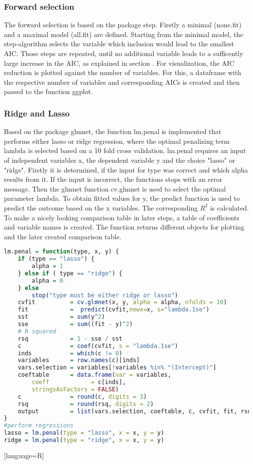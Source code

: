 \subsubsection{Forward selection}
The forward selection is based on the package step. Firstly a minimal (none.fit) and a maximal model (all.fit) are defined. Starting from the minimal model, the step-algorithm selects the variable which inclusion would lead to the smallest AIC. Those steps are repeated, until no additional variable leads to a sufficently large increase in the AIC, as explained in section . 
For visualization, the AIC reduction is plotted against the number of variables. For this, a dataframe with the respective number of variables and corresponding AICs is created and then passed to the function ggplot.


\subsubsection{Ridge and Lasso}
Based on the package glmnet, the function lm.penal is implemented  that performs either lasso or ridge regression, where the optimal penalizing term lambda is selected based on a 10 fold cross validation. lm.penal requires an input of independent variables x, the dependent variable y and the choice "lasso" or "ridge". Firstly it is determined, if the input for type was correct and which alpha results from it. If the input is incorrect, the functions stops with an error message.
Then the glmnet function cv.glmnet is used to select the optimal parameter lambda. To obtain fitted values for y,  the predict function is used  to predict the outcome based on the x variables. The corresponding $R^{2}$ is calculated.
To make a nicely looking comparison table in later steps, a table of coefficients and variable names is created. The function returns different objects for plotting and the later created comparison table.
\begin{lstlisting}[language=R]
lm.penal = function(type, x, y) {
    if (type == "lasso") {
        alpha = 1
    } else if ( type == "ridge") {
        alpha = 0
    } else
        stop("type must be either ridge or lasso")
    cvfit          = cv.glmnet(x, y, alpha = alpha, nfolds = 10)
    fit            =  predict(cvfit,newx=x, s="lambda.1se")
    sst            = sum(y^2)
    sse            = sum((fit - y)^2)
    # R squared
    rsq            = 1 - sse / sst
    c              = coef(cvfit, s = "lambda.1se")
    inds           = which(c != 0)
    variables      = row.names(c)[inds]
    vars.selection = variables[!variables %in% "(Intercept)"]
    coeftable      = data.frame(var = variables,
        coeff            = c[inds],
        stringsAsFactors = FALSE)
    c              = round(c, digits = 3)
    rsq            = round(rsq, digits = 2)
    output         = list(vars.selection, coeftable, c, cvfit, fit, rsq)
}
#perform regressions
lasso = lm.penal(type = "lasso", x = x, y = y)
ridge = lm.penal(type = "ridge", x = x, y = y)
\end{lstlisting}[language=R]

